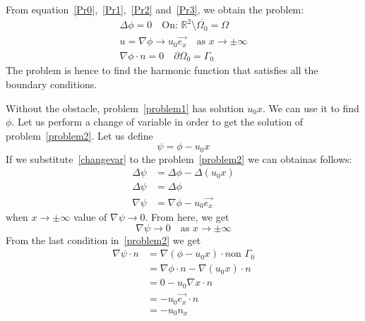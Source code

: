 \documentclass[a4paper,12pt]{article}
\begin{document}
From equation~\eqref{Pr0},~\eqref{Pr1},~\eqref{Pr2} and~\eqref{Pr3}, we obtain the problem:
\begin{align} \label{problem2}
\Delta \phi=0 \quad \text{On: } \mathbb{R}^2 \setminus \overline{\Omega_0}=\Omega\\
u=\nabla\phi\to u_0\vec{e_x}\quad \text{as } x \to \pm\infty\\
\nabla\phi \cdot n=0 \quad \partial \Omega_0=\Gamma_0
\end{align}
The problem is hence to find the harmonic function that satisfies all the boundary conditions.

Without the obstacle, problem~\eqref{problem1} has solution $u_0x$. We can use it to find $\phi$. Let us perform a change of variable in order to get the solution of problem~\eqref{problem2}.
Let us define 
\begin{equation}
\psi=\phi-u_0 x \label{changevar} 
\end{equation}
If we substitute~\eqref{changevar} to the problem~\eqref{problem2} we can obtainas follows:
\begin{align}
 \Delta \psi &= \Delta \phi-\Delta (u_0x)\\
\Delta \psi &= \Delta \phi\\
\nabla \psi &= \nabla\phi-u_0\vec{e_x}
\end{align}
when $x\to\pm\infty$ value of $\nabla \psi\to 0$.
From here, we get 
\begin{equation}
 \nabla\psi\to0 \quad \text{as } x\to\pm\infty
\end{equation}
From the last condition in~\eqref{problem2} we get
\begin{align} 
\nabla\psi\cdot n &= \nabla(\phi-u_0 x)\cdot n \text{on } \Gamma_0\\
&=\nabla\phi \cdot n - \nabla(u_0 x)\cdot n\\
&=0-u_0\nabla x\cdot n\\
&=-u_0 \vec{e_x} \cdot n\\
&=-u_0 n_x
\end{align}
\end{document}

